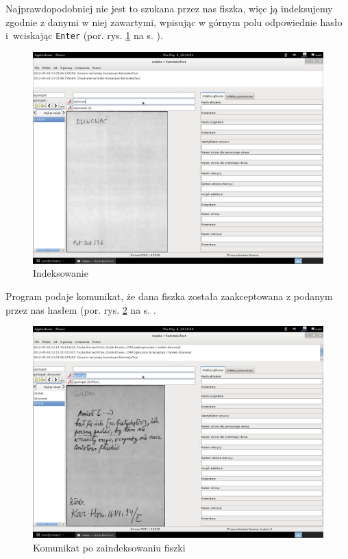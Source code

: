\documentclass[12pt,oneside,notitlepage,titleauthor]{mwart}%
\begin{document}
 
Najprawdopodobniej nie jest to szukana przez nas fiszka, więc ją indeksujemy zgodnie z danymi w niej zawartymi, wpisując w górnym polu odpowiednie hasło i~wciskając \texttt{Enter} (por. rys. \ref{02episkopat} na s. \pageref{02episkopat}). 

\begin{figure}[h]
\includegraphics[scale=0.3]{02episkopat.png}
\caption{Indeksowanie}
\label{02episkopat}
\end{figure}



Program podaje komunikat, że dana fiszka została zaakceptowana z podanym przez nas hasłem (por. rys. \ref{03episkopat} na s. \pageref{03episkopat}.



\begin{figure}[h]
\includegraphics[scale=0.3]{03epispopat.png}
\caption{Komunikat po zaindeksowaniu fiszki}
\label{03episkopat}
\end{figure}
\end{document}
